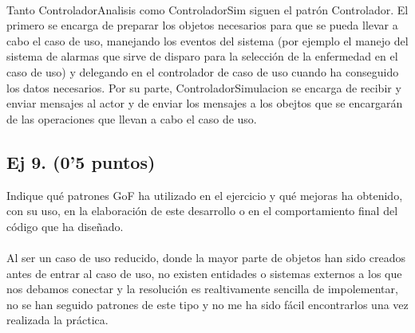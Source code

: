 \documentclass[a4paper]{article}
\begin{document}
\paragraph{}Tanto ControladorAnalisis como ControladorSim siguen el patrón Controlador. El primero se encarga de preparar los objetos necesarios para que se pueda llevar a cabo el caso de uso, manejando los eventos del sistema (por ejemplo el manejo del sistema de alarmas que sirve de disparo para la selección de la enfermedad en el caso de uso) y delegando en el controlador de caso de uso cuando ha conseguido los datos necesarios. Por su parte, ControladorSimulacion se encarga de recibir y enviar mensajes al actor y de enviar los mensajes a los obejtos que se encargarán de las operaciones que llevan a cabo el caso de uso.

\subsection{Ej 9. (0’5 puntos)}
Indique qué patrones GoF ha utilizado en el ejercicio y qué mejoras ha obtenido, con su uso, en la elaboración de este desarrollo o en el comportamiento final del código que ha diseñado.
\paragraph{}Al ser un caso de uso reducido, donde la mayor parte de objetos han sido creados antes de entrar al caso de uso, no existen entidades o sistemas externos a los que nos debamos conectar y la resolución es realtivamente sencilla de impolementar, no se han seguido patrones de este tipo y no me ha sido fácil encontrarlos una vez realizada la práctica.


	
	\printindex %
\end{document}
